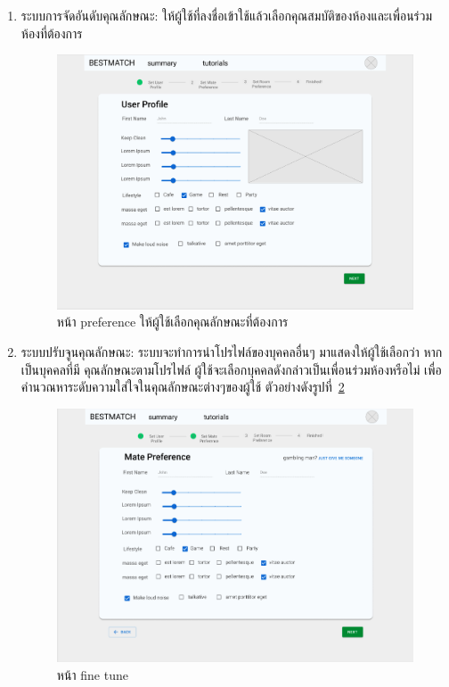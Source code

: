 \begin{enumerate}
  \clearpage
  \item ระบบการจัดอันดับคุณลักษณะ: ให้ผู้ใช้ที่ลงชื่อเข้าใช้แล้วเลือกคุณสมบัติของห้องและเพื่อนร่วมห้องที่ต้องการ
  \begin{figure}[h]
  \begin{center}
  \includegraphics[width=\linewidth]{photo/student/user-profile.png}
  \end{center}
  \caption{หน้า preference ให้ผู้ใช้เลือกคุณลักษณะที่ต้องการ}
  \label{fig:preference}
  \end{figure}
  
  \clearpage
  \item ระบบปรับจูนคุณลักษณะ: ระบบจะทำการนำโปรไฟล์ของบุคคลอื่นๆ มาแสดงให้ผู้ใช้เลือกว่า หากเป็นบุคคลที่มี
  คุณลักษณะตามโปรไฟล์ ผู้ใช้จะเลือกบุคคลดังกล่าวเป็นเพื่อนร่วมห้องหรือไม่ เพื่อคำนวณหาระดับความใส่ใจในคุณลักษณะต่างๆของผู้ใช้ 
  ตัวอย่างดังรูปที่~\ref{fig:finetune}
  \begin{figure}[h]
  \begin{center}
  \includegraphics[width=\linewidth]{photo/student/mate-pref.png}
  \end{center}
  \caption{หน้า fine tune}
  \label{fig:finetune}
  \end{figure}


\end{enumerate}
